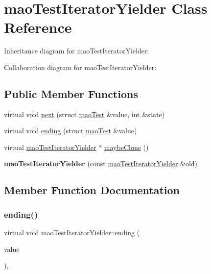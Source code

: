 \hypertarget{classmaoTestIteratorYielder}{}\section{mao\+Test\+Iterator\+Yielder Class Reference}
\label{classmaoTestIteratorYielder}


Inheritance diagram for mao\+Test\+Iterator\+Yielder\+:


Collaboration diagram for mao\+Test\+Iterator\+Yielder\+:
\subsection*{Public Member Functions}
\begin{DoxyCompactItemize}
\item 
virtual void \hyperlink{classmaoTestIteratorYielder_a88aff5d153ff1dfdd54710706da7eeec}{next} (struct \hyperlink{structmaoTest}{mao\+Test} \&value, int \&state)
\item 
virtual void \hyperlink{classmaoTestIteratorYielder_aac4528a277c8ee351b97131d861ec11d}{ending} (struct \hyperlink{structmaoTest}{mao\+Test} \&value)
\item 
virtual \hyperlink{classmaoTestIteratorYielder}{mao\+Test\+Iterator\+Yielder} $\ast$ \hyperlink{classmaoTestIteratorYielder_a1ecc09d34a4b6924317eb42c7fb652ac}{maybe\+Clone} ()
\item 
\mbox{\label{classmaoTestIteratorYielder_a802649d666f9ed4549f74eebeaa69856}} 
{\bfseries mao\+Test\+Iterator\+Yielder} (const \hyperlink{classmaoTestIteratorYielder}{mao\+Test\+Iterator\+Yielder} \&old)
\end{DoxyCompactItemize}


\subsection{Member Function Documentation}
\mbox{\label{classmaoTestIteratorYielder_aac4528a277c8ee351b97131d861ec11d}} 
\subsubsection{\texorpdfstring{ending()}{ending()}}
{\footnotesize\ttfamily virtual void mao\+Test\+Iterator\+Yielder\+::ending (\begin{DoxyParamCaption}\item[{struct \hyperlink{structmaoTest}{mao\+Test} \&}]{value }\end{DoxyParamCaption})\hspace{0.3cm}{\ttfamily [inline]}, {\ttfamily [virtual]}}

